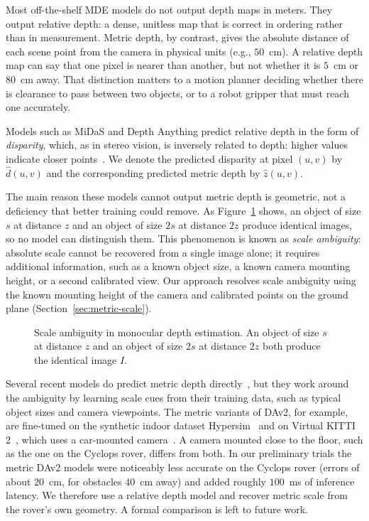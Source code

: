 Most off-the-shelf MDE models do not output depth maps in meters. They output relative depth: a dense,
unitless map that is correct in ordering rather than in measurement. Metric depth, by contrast,
gives the absolute distance of each scene point from the camera in physical units (e.g.,
$50$~cm). A relative depth map can say that one pixel is nearer than another, but not whether it
is $5$~cm or $80$~cm away. That distinction matters to a motion planner deciding whether there is
clearance to pass between two objects, or to a robot gripper that must reach one accurately.

Models such as MiDaS and Depth Anything predict relative depth in the form of
\emph{disparity}, which, as in stereo vision, is inversely related to depth: higher values
indicate closer points~\cite{MiDaS}. We denote the predicted disparity at pixel $(u,v)$ by
$\hat{d}(u,v)$ and the corresponding predicted metric depth by $\hat{z}(u,v)$.

The main reason these models cannot output metric depth is geometric, not a deficiency that
better training could remove. As Figure~\ref{fig:scale-ambiguity} shows, an object of size $s$ at
distance $z$ and an object of size $2s$ at distance $2z$ produce identical images, so no model can
distinguish them. This phenomenon is known as \emph{scale ambiguity}: absolute scale cannot be
recovered from a single image alone; it requires
additional information, such as a known object size, a known camera mounting height, or a second
calibrated view. Our approach resolves scale ambiguity using the known mounting height of the
camera and calibrated points on the ground plane (Section~\ref{sec:metric-scale}).

\begin{figure}[htbp]
  \centering
  
  \caption[Scale ambiguity in monocular depth estimation]{Scale ambiguity in monocular depth
    estimation. An object of size $s$ at distance $z$ and an object of size $2s$ at distance $2z$
    both produce the identical image $I$.}
  \label{fig:scale-ambiguity}
\end{figure}

Several recent models do predict metric depth directly~\cite{DepthAnythingV2,MoGe}, but they
work around the ambiguity by learning scale cues from their training data, such as typical object
sizes and camera viewpoints. The metric variants of DAv2, for example, are fine-tuned on the
synthetic indoor dataset Hypersim~\cite{hypersim} and on Virtual KITTI 2~\cite{virtualkitti2},
which uses a car-mounted camera~\cite{DepthAnythingV2}. A camera mounted close to the floor, such as the one on the Cyclops rover, differs from both. In our preliminary trials the metric DAv2 models were
noticeably less accurate on the Cyclops rover (errors of about $20$~cm, for obstacles $40$~cm away) and added
roughly $100$~ms of inference latency. We therefore use a relative depth model and recover metric
scale from the rover's own geometry. A formal comparison is left to future work.
